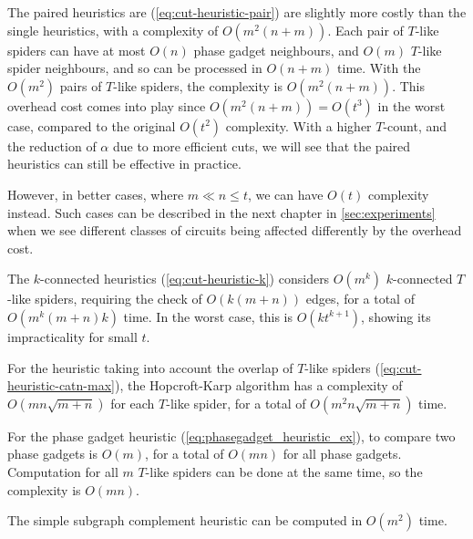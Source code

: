 The paired heuristics are (\ref{eq:cut-heuristic-pair}) are slightly more costly than 
the single heuristics, with a complexity of $O(m^2(n+m))$.
Each pair of $T$-like spiders can have at most $O(n)$ phase gadget neighbours,
and $O(m)$ $T$-like spider neighbours, and so can be processed in $O(n+m)$ time.
With the $O(m^2)$ pairs of $T$-like spiders, the complexity is $O(m^2(n+m))$.
This overhead cost comes into play since $O(m^2(n+m)) = O(t^3)$ in the worst case,
compared to the original $O(t^2)$ complexity. 
With a higher $T$-count, and the reduction of $\alpha$ due to more efficient cuts,
we will see that the paired heuristics can still be effective in practice.

However, in better cases, where $m \ll n \leq t$, we can have $O(t)$ complexity instead.
Such cases can be described in the next chapter in \autoref{sec:experiments} 
when we see different classes of circuits being affected differently by the overhead cost.

The $k$-connected heuristics (\ref{eq:cut-heuristic-k}) considers $O(m^k)$ $k$-connected $T$-like spiders,
requiring the check of $O(k(m+n))$ edges, for a total of $O(m^k(m+n)k)$ time.
In the worst case, this is $O(kt^{k+1})$, showing its impracticality for small $t$.

For the heuristic taking into account the overlap of $T$-like spiders (\ref{eq:cut-heuristic-catn-max}),
the Hopcroft-Karp algorithm has a complexity of $O(mn\sqrt{m+n})$ for each $T$-like spider,
for a total of $O(m^2 n\sqrt{m+n})$ time.

For the phase gadget heuristic (\ref{eq:phasegadget_heuristic_ex}), to compare two phase gadgets is $O(m)$,
for a total of $O(mn)$ for all phase gadgets.
Computation for all $m$ $T$-like spiders can be done at the same time, so the complexity is $O(mn)$.

The simple subgraph complement heuristic can be computed in $O(m^2)$ time.